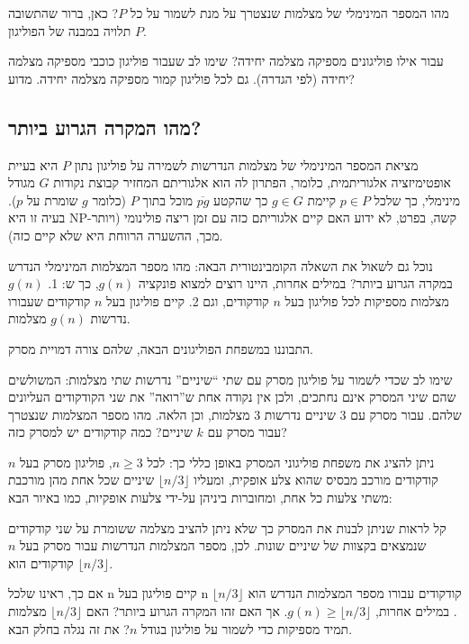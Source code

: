 \documentclass[
]{book}
\begin{document}
מהו המספר המינימלי של מצלמות שנצטרך על מנת לשמור על כל \(P\)? כאן, ברור שהתשובה תלויה במבנה של הפוליגון \(P\).

עבור אילו פוליגונים מספיקה מצלמה יחידה? שימו לב שעבור פוליגון כוכבי מספיקה מצלמה יחידה (לפי הגדרה). גם לכל פוליגון קמור מספיקה מצלמה יחידה. מדוע?

\hypertarget{worst-case}{%
\subsection{מהו המקרה הגרוע ביותר?}\label{worst-case}}

מציאת המספר המינימלי של מצלמות הנדרשות לשמירה על פוליגון נתון \(P\) היא בעיית אופטימיזציה אלגוריתמית, כלומר, הפתרון לה הוא אלגוריתם המחזיר קבוצת נקודות \(G\) מגודל מינימלי, כך שלכל \(p\in P\) קיימת \(g \in G\) כך שהקטע \(\overline{pg}\) מוכל בתוך \(P\) (כלומר \(g\) שומרת על \(p\)). בעיה זו היא NP-קשה, בפרט, לא ידוע האם קיים אלגוריתם כזה עם זמן ריצה פולינומי (ויותר מכך, ההשערה הרווחת היא שלא קיים כזה).

נוכל גם לשאול את השאלה הקומבינטורית הבאה: מהו מספר המצלמות המינימלי הנדרש במקרה הגרוע ביותר? במילים אחרות, היינו רוצים למצוא פונקציה \(g(n)\), כך ש: 1. \(g(n)\) מצלמות מספיקות לכל פוליגון בעל \(n\) קודקודים, וגם 2. קיים פוליגון בעל \(n\) קודקודים שעבורו נדרשות \(g(n)\) מצלמות.

התבוננו במשפחת הפוליגונים הבאה, שלהם צורה דמויית מסרק.

שימו לב שכדי לשמור על פוליגון מסרק עם שתי ``שיניים'' נדרשות שתי מצלמות: המשולשים שהם שיני המסרק אינם נחתכים, ולכן אין נקודה אחת ש''רואה'' את שני הקודקודים העליונים שלהם. עבור מסרק עם 3 שיניים נדרשות 3 מצלמות, וכן הלאה. מהו מספר המצלמות שנצטרך עבור מסרק עם \(k\) שיניים? כמה קודקודים יש למסרק כזה?

ניתן להציג את משפחת פוליגוני המסרק באופן כללי כך: לכל \(n \ge 3\), פוליגון מסרק בעל \(n\) קודקודים מורכב מבסיס שהוא צלע אופקית, ומעליו \(\lfloor n / 3 \rfloor\) שיניים שכל אחת מהן מורכבת משתי צלעות כל אחת, ומחוברות ביניהן על-ידי צלעות אופקיות, כמו באיור הבא:

קל לראות שניתן לבנות את המסרק כך שלא ניתן להציב מצלמה ששומרת על שני קודקודים שנמצאים בקצוות של שיניים שונות. לכן, מספר המצלמות הנדרשות עבור מסרק בעל \(n\) קודקודים הוא \(\lfloor n/3 \rfloor\).

אם כך, ראינו שלכל n קיים פוליגון בעל n קודקודים עבורו מספר המצלמות הנדרש הוא \(\lfloor n/3 \rfloor\). במילים אחרות, \(g(n)\ge \lfloor n/3 \rfloor\). אך האם זהו המקרה הגרוע ביותר? האם \(\lfloor n/3 \rfloor\) מצלמות תמיד מספיקות כדי לשמור על פוליגון בגודל \(n\)? את זה נגלה בחלק הבא.
\end{document}
